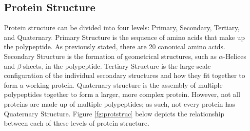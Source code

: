 \documentclass[pageno]{jpaper}
\begin{document}
\subsection{Protein Structure}
Protein structure can be divided into four levels: Primary, Secondary, Tertiary, and Quaternary.  Primary Structure is the sequence of amino acids that make up the polypeptide.  As previously stated, there are 20 canonical amino acids.  Secondary Structure is the formation of geometrical structures, such as $\alpha$-Helices and $\beta$-sheets, in the polypeptide.  Tertiary Structure is the large-scale configuration of the individual secondary structures and how they fit together to form a working protein.  Quaternary structure is the assembly of multiple polypeptides together to form a larger, more complex protein.  However, not all proteins are made up of multiple polypeptides; as such, not every protein has Quaternary Structure.  Figure \ref{fg:protstruc} below depicts the relationship between each of these levels of protein structure.
\end{document}
